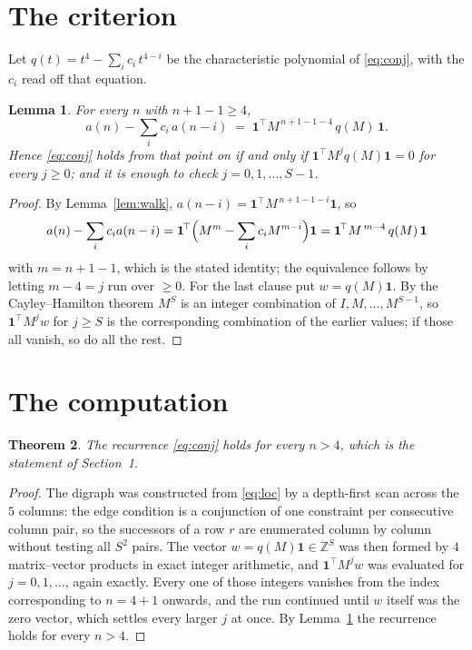 \documentclass[11pt,a4paper]{article}
\theoremstyle{plain}
\newtheorem{theorem}{Theorem}
\newtheorem{lemma}[theorem]{Lemma}
\theoremstyle{definition}
\begin{document}
\section{The criterion}

Let $q(t)=t^{4}-\sum_i c_i\,t^{4-i}$ be the characteristic polynomial of
\eqref{eq:conj}, with the $c_i$ read off that equation.

\begin{lemma}\label{lem:crit}
For every $n$ with $n+1-1\ge4$,
\[
a(n)-\sum_i c_i\,a(n-i)\;=\;\mathbf{1}^{\!\top}M^{\,n+1-1-4}\,q(M)\,\mathbf{1} .
\]
Hence \eqref{eq:conj} holds from that point on if and only if
$\mathbf{1}^{\!\top}M^{j}q(M)\mathbf{1}=0$ for every $j\ge0$; and it is enough to check
$j=0,1,\dots,S-1$.
\end{lemma}

\begin{proof}
By Lemma~\ref{lem:walk}, $a(n-i)=\mathbf{1}^{\!\top}M^{\,n+1-1-i}\mathbf{1}$, so
\[
a(n)-\sum_i c_i a(n-i)
=\mathbf{1}^{\!\top}\Bigl(M^{m}-\sum_i c_i M^{m-i}\Bigr)\mathbf{1}
=\mathbf{1}^{\!\top}M^{\,m-4}\,q(M)\,\mathbf{1}
\]
with $m=n+1-1$, which is the stated identity; the equivalence follows by letting
$m-4=j$ run over $\ge0$. For the last clause put $w=q(M)\mathbf{1}$. By the
Cayley--Hamilton theorem $M^{S}$ is an integer combination of $I,M,\dots,M^{S-1}$, so
$\mathbf{1}^{\!\top}M^{j}w$ for $j\ge S$ is the corresponding combination of the earlier
values; if those all vanish, so do all the rest.
\end{proof}

\section{The computation}

\begin{theorem}
The recurrence \eqref{eq:conj} holds for every $n>4$, which is the statement of
Section~1.
\end{theorem}

\begin{proof}
The digraph was constructed from \eqref{eq:loc} by a depth-first scan across the $5$
columns: the edge condition is a conjunction of one constraint per consecutive column
pair, so the successors of a row $r$ are enumerated column by column without testing all
$S^2$ pairs. The vector $w=q(M)\mathbf{1}\in\mathbb{Z}^{S}$ was then formed by $4$
matrix--vector products in exact integer arithmetic, and $\mathbf{1}^{\!\top}M^{j}w$ was
evaluated for $j=0,1,\dots$, again exactly. Every one of those integers vanishes from the
index corresponding to $n=4+1$ onwards, and the run continued until $w$ itself was the
zero vector, which settles every larger $j$ at once. By Lemma~\ref{lem:crit} the recurrence
holds for every $n>4$.
\end{proof}
\end{document}
